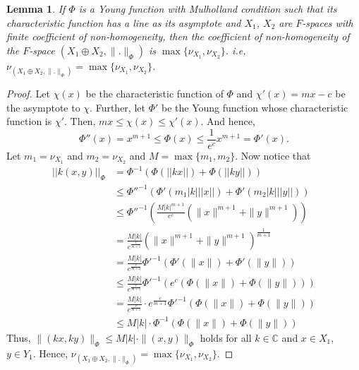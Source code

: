 \documentclass[pdflatex,sn-mathphys-num]{sn-jnl}%
\theoremstyle{thmstyleone}%
\newtheorem{lemma}{Lemma}
\theoremstyle{thmstyletwo}%
\theoremstyle{thmstylethree}%
\begin{document}
	\begin{lemma}\label{coeff}
		If $\Phi$ is a Young function with Mulholland condition such that its characteristic function has a line as its asymptote and $X_1$, $X_2$ are $F$-spaces with finite coefficient of non-homogeneity, then the coefficient of non-homogeneity of the $F$-space $(X_1\oplus X_2,\|.\|_\Phi)$ is $\max\{\nu_{X_1},\nu_{X_2}\}$. i.e, $\nu_{(X_1\oplus X_2,\|.\|_\Phi)}=\max\{\nu_{X_1},\nu_{X_2}\}$.
	\end{lemma}
	\begin{proof}
		Let $\chi(x)$ be the characteristic function of $\Phi$ and $\chi'(x)=mx-c$ be the asymptote to $\chi$. Further, let $\Phi'$ be the Young function whose characteristic function is $\chi'$. Then, $mx\leq \chi(x)\leq \chi'(x)$. And hence,
		$$\Phi''(x)=x^{m+1}\leq \Phi(x)\leq \frac{1}{e^c}x^{m+1}=\Phi'(x).$$
		Let $m_1=\nu_{X_1}$ and $m_2=\nu_{X_2}$ and $M=\max\{m_1,m_2\}$. Now notice that
	\begin{align}
			||k(x,y)||_\Phi&=\Phi^{-1}\left(\Phi(||kx||)+\Phi(||ky||)\right)\nonumber\\&\leq {\Phi''}^{-1}\left(\Phi'(m_1|k|||x||)+\Phi'(m_2|k|||y||)\right)\nonumber\\
			&\leq  \Phi''^{-1}\left(\frac{{M|k|}^{m+1}}{e^c}(\|x\|^{m+1}+\|y\|^{m+1})\right)\nonumber\\&=\frac{M|k|}{e^{\frac{c}{m+1}}}\left(\|x\|^{m+1}+\|y\|^{m+1}\right)^{\frac{1}{m+1}}\nonumber\\&=\frac{M|k|}{e^{\frac{c}{m+1}}}\Phi'^{-1}\left(\Phi'(\|x\|)+\Phi'(\|y\|)\right)\nonumber\\&\leq \frac{M|k|}{e^{\frac{c}{m+1}}}\Phi'^{-1}\left(e^c(\Phi(\|x\|)+\Phi(\|y\|))\right)\nonumber\\&=\frac{M|k|}{e^{\frac{c}{m+1}}}\cdot e^{\frac{c}{m+1}}\Phi'^{-1}\left(\Phi(\|x\|)+\Phi(\|y\|)\right)\nonumber\\&\leq M|k|\cdot\Phi^{-1}\left(\Phi(\|x\|)+\Phi(\|y\|)\right)
	\end{align}
	Thus, $\|(kx,ky)\|_\Phi\leq M|k|\cdot\|(x,y)\|_\Phi$ holds for all $k\in \mathbb C$ and $x\in X_1$, $y\in Y_1$. Hence, $\nu_{(X_1\oplus X_2,\|.\|_\Phi)}=\max\{\nu_{X_1},\nu_{X_2}\}$.
		\end{proof}
	
\end{document}
